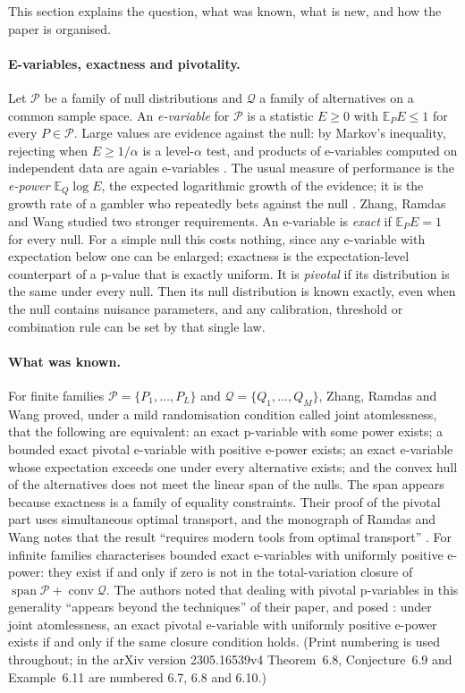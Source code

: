 \documentclass[11pt,a4paper]{article}
\theoremstyle{definition}
\theoremstyle{remark}
\newcommand{\PP}{\mathcal P}
\newcommand{\QQ}{\mathcal Q}
\newcommand{\EE}{\mathbb E}
\newcommand{\conv}{\operatorname{conv}}
\newcommand{\spn}{\operatorname{span}}
\begin{document}
This section explains the question, what was known, what is new, and how the paper is organised.

\paragraph{E-variables, exactness and pivotality.}
Let \(\PP\) be a family of null distributions and \(\QQ\) a family of alternatives on a common sample space. An \emph{e-variable} for \(\PP\) is a statistic \(E\ge0\) with \(\EE_PE\le1\) for every \(P\in\PP\). Large values are evidence against the null: by Markov's inequality, rejecting when \(E\ge1/\alpha\) is a level-\(\alpha\) test, and products of e-variables computed on independent data are again e-variables \cite{VovkWang,RamdasWang}. The usual measure of performance is the \emph{e-power} \(\EE_Q\log E\), the expected logarithmic growth of the evidence; it is the growth rate of a gambler who repeatedly bets against the null \cite{Kelly,GHK}. Zhang, Ramdas and Wang \cite{ZRW} studied two stronger requirements. An e-variable is \emph{exact} if \(\EE_PE=1\) for every null. For a simple null this costs nothing, since any e-variable with expectation below one can be enlarged; exactness is the expectation-level counterpart of a p-value that is exactly uniform. It is \emph{pivotal} if its distribution is the same under every null. Then its null distribution is known exactly, even when the null contains nuisance parameters, and any calibration, threshold or combination rule can be set by that single law.

\paragraph{What was known.}
For finite families \(\PP=\{P_1,\dots,P_L\}\) and \(\QQ=\{Q_1,\dots,Q_M\}\), Zhang, Ramdas and Wang \cite[Theorem~6.1]{ZRW} proved, under a mild randomisation condition called joint atomlessness, that the following are equivalent: an exact p-variable with some power exists; a bounded exact pivotal e-variable with positive e-power exists; an exact e-variable whose expectation exceeds one under every alternative exists; and the convex hull of the alternatives does not meet the linear span of the nulls. The span appears because exactness is a family of equality constraints. Their proof of the pivotal part uses simultaneous optimal transport, and the monograph of Ramdas and Wang notes that the result ``requires modern tools from optimal transport'' \cite[Section~14.3]{RamdasWang}. For infinite families \cite[Theorem~6.8]{ZRW} characterises bounded exact e-variables with uniformly positive e-power: they exist if and only if zero is not in the total-variation closure of \(\spn\PP+\conv\QQ\). The authors noted that dealing with pivotal p-variables in this generality ``appears beyond the techniques'' of their paper, and posed \cite[Conjecture~6.9]{ZRW}: under joint atomlessness, an exact pivotal e-variable with uniformly positive e-power exists if and only if the same closure condition holds. (Print numbering is used throughout; in the arXiv version 2305.16539v4 Theorem~6.8, Conjecture~6.9 and Example~6.11 are numbered 6.7, 6.8 and 6.10.)
\end{document}
